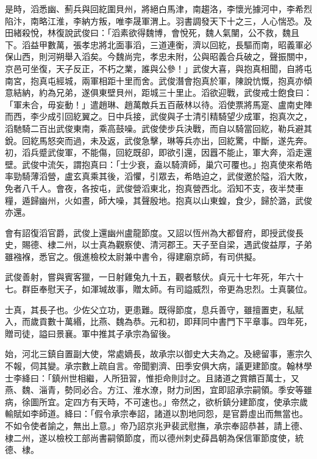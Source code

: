 \begin{pinyinscope}
 是時，滔悉幽、薊兵與回紇圍貝州，將絕白馬津，南趨洛，李懷光據河中，李希烈陷汴，南略江淮，李納方叛，唯李晟軍渭上。羽書調發天下十之三，人心惴恐。及田緒殺悅，林復說武俊曰：「滔素欲得魏博，會悅死，魏人氣闉，公不救，魏且下。滔益甲數萬，張孝忠將北面事滔，三道連衡，濟以回紇，長驅而南，昭義軍必保山西，則河朔舉入滔矣。今魏尚完，孝忠未附，公與昭義合兵破之，聲振關中，京邑可坐復，天子反正，不朽之業，誰與公參！」武俊大喜，與抱真相聞，自將屯南宮，抱真屯經城，兩軍相距十里而舍。武俊潛會抱真於軍，陳說忼慨，抱真亦傾意結納，約為兄弟，遂俱東壁貝州，距城三十里止。滔欲迎戰，武俊戒士飽食曰：「軍未合，毋妄動！」遣趙琳、趙萬敵兵五百蔽林以待。滔使票將馬寔、盧南史陣而西，李少成引回紇翼之。日中兵接，武俊與子士清引精騎望少成軍，抱真次之，滔馳騎二百出武俊東南，乘高鼓噪。武俊使步兵決戰，而自以騎當回紇，勒兵避其銳。回紇馬怒突而過，未及返，武俊急擊，琳等兵亦出，回紇驚，中斷，遂先奔。初，滔兵蹙武俊軍，不能傷，回紇既卻，即欲引還，因囂不能止，軍大奔，滔走還壁。武俊中流矢，謂抱真曰：「士少衰，盍以騎濟師，巢穴可覆也。」抱真使來希皓率勁騎薄滔營，盧玄真乘其後，滔懼，引眾去，希皓迫之，武俊邀於隘，滔大敗，免者八千人。會夜，各按屯，武俊營滔東北，抱真營西北。滔知不支，夜半焚車糧，遁歸幽州，火如晝，師大噪，其聲殷地。抱真以山東蝗，食少，歸於潞，武俊亦還。



 會有詔復滔官爵，武俊上還幽州盧龍節度。又詔以恆州為大都督府，即授武俊長史，賜德、棣二州，以士真為觀察使、清河郡王。天子至自梁，遇武俊益厚，子弟雖襁褓，悉官之。俄進檢校太尉兼中書令，得建廟京師，有司供擬。



 武俊善射，嘗與賓客獵，一日射雞兔九十五，觀者駭伏。貞元十七年死，年六十七。群臣奉慰天子，如渾瑊故事，贈太師。有司謚威烈，帝更為忠烈。士真襲位。



 士真，其長子也。少佐父立功，更患難。既得節度，息兵善守，雖擅置吏，私賦入，而歲貢數十萬緡，比燕、魏為恭。元和初，即拜同中書門下平章事。四年死，贈司徒，謚曰景襄。軍中推其子承宗為留後。



 始，河北三鎮自置副大使，常處嫡長，故承宗以御史大夫為之。及總留事，憲宗久不報，伺其變。承宗數上疏自言。帝聞劉濟、田季安俱大病，議更建節度。翰林學士李絳曰：「鎮州世相繼，人所狃習，惟拒命則討之。且諸道之賞饋百萬士，又燕、魏、淄青，勢同必合。方江、淮水潦，財力刓困，宜即詔承宗嗣領。季安等雖病，徐圖所宜。定四方有天時，不可速也。」帝然之，欲析鎮分建節度，使承宗歲輸賦如李師道。絳曰：「假令承宗奉詔，諸道以割地同怨，是官爵虛出而無當也。不如令使者諭之，無出上意。」帝乃詔京兆尹裴武慰撫，承宗奉詔恭甚，請上德、棣二州，遂以檢校工部尚書嗣領節度，而以德州刺史薛昌朝為保信軍節度使，統德、棣。




\end{pinyinscope}
